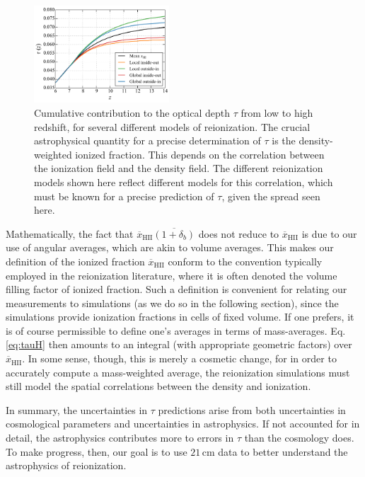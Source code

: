 \documentclass[twocolumn,aps,prd,nofootinbib,showpacs]{revtex4-1}
\begin{document}
\begin{figure}[!]
	\centering
	\includegraphics[width=0.45\textwidth]{figures/insideOutvsOutsideIn.pdf}
	\caption{Cumulative contribution to the optical depth $\tau$ from low to high redshift, for several different models of reionization. The crucial astrophysical quantity for a precise determination of $\tau$ is the density-weighted ionized fraction. This depends on the correlation between the ionization field and the density field. The different reionization models shown here reflect different models for this correlation, which must be known for a precise prediction of $\tau$, given the spread seen here.}
	\label{fig:InsideOutvsOutsideIn}
\end{figure}

Mathematically, the fact that $\overline{x}_\textrm{HII}\overline{ (1+\delta_b)}$ does not reduce to $\overline{x}_\textrm{HII}$ is due to our use of angular averages, which are akin to volume averages. This makes our definition of the ionized fraction $\overline{x}_\textrm{HII}$ conform to the convention typically employed in the reionization literature, where it is often denoted the volume filling factor of ionized fraction. Such a definition is convenient for relating our measurements to simulations (as we do so in the following section), since the simulations provide ionization fractions in cells of fixed volume. If one prefers, it is of course permissible to define one's averages in terms of mass-averages. Eq. \eqref{eq:tauH} then amounts to an integral (with appropriate geometric factors) over $\overline{x}_\textrm{HII}$. In some sense, though, this is merely a cosmetic change, for in order to accurately compute a mass-weighted average, the reionization simulations must still model the spatial correlations between the density and ionization.

In summary, the uncertainties in $\tau$ predictions arise from both uncertainties in cosmological parameters and uncertainties in astrophysics. If not accounted for in detail, the astrophysics contributes more to errors in $\tau$ than the cosmology does. To make progress, then, our goal is to use $21\,\textrm{cm}$ data to better understand the astrophysics of reionization.
\end{document}
